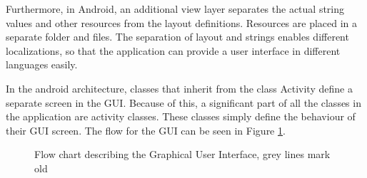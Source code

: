 Furthermore, in Android, an additional view layer separates the actual string values and other resources from the layout definitions. Resources are placed in a separate folder and files. The separation of layout and strings enables different localizations, so that the application can provide a user interface in different languages easily. 

In the android architecture, classes that inherit from the class Activity define a separate screen in the GUI. Because of this, a significant part of all the classes in the application are activity classes. These classes simply define the behaviour of their GUI screen. The flow for the GUI can be seen in Figure \ref{fig:GUIFlowchart}.
\begin{figure}
\setlength\fboxsep{0pt}
\setlength\fboxrule{1pt}\noindent{}
\caption{Flow chart describing the Graphical User Interface, grey lines mark old}
\label{fig:GUIFlowchart}
\end{figure}

\pagebreak

